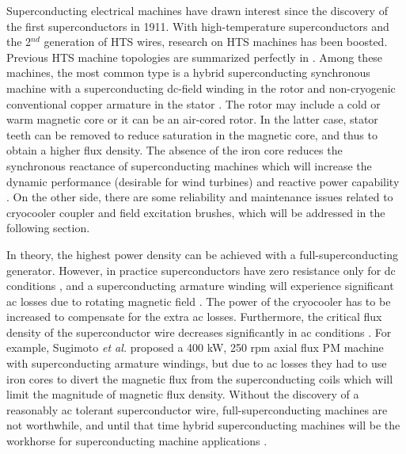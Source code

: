\documentclass[final,peerreview,onecolumn]{IEEEtran}
\begin{document}
Superconducting electrical machines have drawn interest since the discovery of the first superconductors in 1911. With high-temperature superconductors and the 2$^{nd}$ generation of HTS wires, research on HTS machines has been boosted. Previous HTS machine topologies are summarized perfectly in \cite{Kalsi2004, Barnes2005,Gieras2008a}. Among these machines, the most common type is a hybrid superconducting synchronous machine with a superconducting dc-field winding in the rotor and non-cryogenic conventional copper armature in the stator \cite{Barnes2005, Klaus2007}. The rotor may include a cold or warm magnetic core or it can be an air-cored rotor. In the latter case, stator teeth can be removed to reduce saturation in the magnetic core, and thus to obtain a higher flux density. The absence of the iron core reduces the synchronous reactance of superconducting machines which will increase the dynamic performance (desirable for wind turbines) and reactive power capability \cite{Kalsi2004}. On the other side, there are some reliability and maintenance issues related to cryocooler coupler and field excitation brushes, which will be addressed in the following section.

In theory, the highest power density can be achieved with a full-superconducting generator. However, in practice superconductors have zero resistance only for dc conditions \cite{Bray2009}, and a superconducting armature winding will experience significant ac losses due to rotating magnetic field \cite{Barnes2005}.  The power of the cryocooler has to be increased to compensate for the extra ac losses. Furthermore, the critical flux density of the superconductor wire decreases significantly in ac conditions \cite{Barnes2005}. For example, Sugimoto \textit{et al.} proposed a 400 kW, 250 rpm axial flux PM machine \cite{Sugimoto2007a} with superconducting armature windings, but due to ac losses they had to use iron cores to divert the magnetic flux from the superconducting coils which will limit the magnitude of magnetic flux density. Without the discovery of a reasonably ac tolerant superconductor wire, full-superconducting machines are not worthwhile, and until that time hybrid superconducting machines will be the workhorse for superconducting machine applications \cite{Barnes2005,Klaus2007}.
\end{document}
